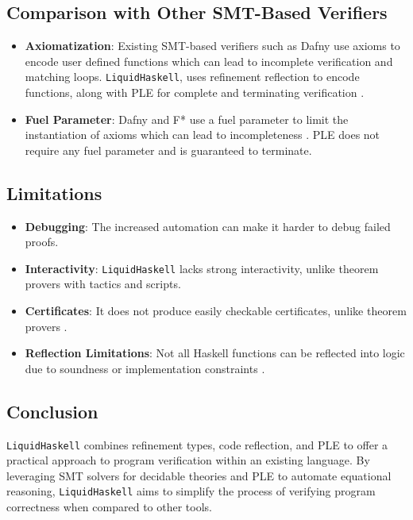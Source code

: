 \documentclass[]{rptuseminar}
\begin{document}
\subsection*{Comparison with Other SMT-Based Verifiers}
\begin{itemize}
    \item \textbf{Axiomatization}: Existing SMT-based verifiers such as Dafny use axioms to encode user defined functions 
        which can lead to incomplete verification and matching loops. \texttt{LiquidHaskell}, uses refinement 
        reflection to encode functions, along with PLE for complete and terminating verification \cite{vazou_refinement_2018}.
    \item \textbf{Fuel Parameter}: Dafny and F* use a fuel parameter to limit the instantiation of axioms which can lead 
      to incompleteness \cite{vazou_refinement_2018}. PLE does not require any fuel parameter and is guaranteed to terminate.
\end{itemize}

\subsection*{Limitations}

\begin{itemize}
    \item \textbf{Debugging}: The increased automation can make it harder to debug failed proofs.
    \item \textbf{Interactivity}: \texttt{LiquidHaskell} lacks strong interactivity, unlike theorem provers with tactics and scripts.
    \item \textbf{Certificates}: It does not produce easily checkable certificates, unlike theorem provers \cite{vazou_refinement_2018}.
    \item \textbf{Reflection Limitations}: Not all Haskell functions can be reflected into logic due to soundness or implementation constraints \cite{vazou_refinement_2018}.
\end{itemize}

\subsection*{Conclusion}

\texttt{LiquidHaskell} combines refinement types, code reflection, and PLE to offer a practical approach to program verification within an existing language. By leveraging SMT solvers for decidable theories and PLE to automate equational reasoning, \texttt{LiquidHaskell} aims to simplify the process of verifying program correctness when compared to other tools.
\label{sec:conclusions}
\newpage
\end{document}
